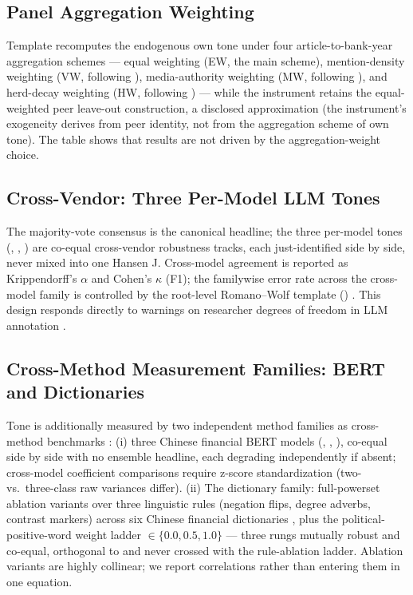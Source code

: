 \subsection{Panel Aggregation Weighting}
Template  recomputes the endogenous own tone under four
article-to-bank-year aggregation schemes --- equal weighting (EW, the main scheme),
mention-density weighting (VW, following \textcite{hassan2019firm}), media-authority
weighting (MW, following \textcite{holzman2023curbing}), and herd-decay weighting (HW,
following \textcite{tetlock2011stale}) --- while the instrument retains the equal-weighted
peer leave-out construction, a disclosed approximation (the instrument's exogeneity derives
from peer identity, not from the aggregation scheme of own tone). The table shows that
results are not driven by the aggregation-weight choice.

\subsection{Cross-Vendor: Three Per-Model LLM Tones}
The majority-vote consensus  is the canonical headline; the three
per-model tones (, , ) are
co-equal cross-vendor robustness tracks, each just-identified side by side, never mixed into
one Hansen J. Cross-model agreement is reported as Krippendorff's $\alpha$ and Cohen's
$\kappa$ (F1); the familywise error rate across the cross-model family is controlled by the
root-level Romano--Wolf template ()
\parencite{romano2005stepdown}. This design responds directly to warnings on researcher
degrees of freedom in LLM annotation \parencite{baumann2025llmhacking,ludwig2025llmframework}.

\subsection{Cross-Method Measurement Families: BERT and Dictionaries}
Tone is additionally measured by two independent method families as cross-method benchmarks
\parencite{shapiro2022newssentiment,hansen2023fedspeak}: (i) three Chinese financial BERT
models (, , ), co-equal side by side with
no ensemble headline, each degrading independently if absent; cross-model coefficient
comparisons require z-score standardization (two- vs.\ three-class raw variances differ).
(ii) The dictionary family: full-powerset ablation variants over three linguistic rules
(negation flips, degree adverbs, contrast markers) across six Chinese financial dictionaries
\parencite{du2022chinesedict}, plus the  political-positive-word weight ladder
$\in \{0.0, 0.5, 1.0\}$ --- three rungs mutually robust and co-equal, orthogonal to and never
crossed with the rule-ablation ladder. Ablation variants are highly collinear; we report
correlations rather than entering them in one equation.

